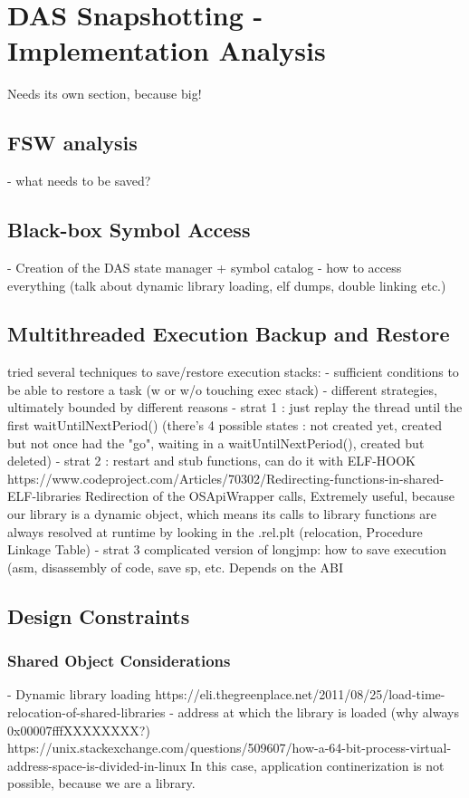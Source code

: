 {
\setlength{\parindent}{2em}
\chapter{DAS Snapshotting - Implementation Analysis}\label{cha:das-impl}
Needs its own section, because big!
\section{FSW analysis}
- what needs to be saved?
\section{Black-box Symbol Access}
- Creation of the DAS state manager + symbol catalog
- how to access everything (talk about dynamic library loading, elf dumps, double linking etc.)
\section{Multithreaded Execution Backup and Restore}
tried several techniques to save/restore execution stacks:
- sufficient conditions to be able to restore a task (w or w/o touching exec stack)
- different strategies, ultimately bounded by different reasons 
- strat 1 : just replay the thread until the first waitUntilNextPeriod() (there's 4 possible states : not created yet, created but not once had the "go", waiting in a waitUntilNextPeriod(), created but deleted)
- strat 2 : restart and stub functions, can do it with ELF-HOOK https://www.codeproject.com/Articles/70302/Redirecting-functions-in-shared-ELF-libraries
	Redirection of the OSApiWrapper calls, Extremely useful, because our library is a dynamic object, which means its calls to library functions are always resolved at runtime by looking in the .rel.plt (relocation, Procedure Linkage Table)
- strat 3 complicated version of longjmp: how to save execution (asm, disassembly of code, save sp, etc.%
Depends on the ABI
\section{Design Constraints}
\subsection*{Shared Object Considerations}\label{sec:dynlib-considerations}
- Dynamic library loading  https://eli.thegreenplace.net/2011/08/25/load-time-relocation-of-shared-libraries
- address at which the library is loaded (why always 0x00007fffXXXXXXXX?) https://unix.stackexchange.com/questions/509607/how-a-64-bit-process-virtual-address-space-is-divided-in-linux
In this case, application continerization is not possible, because we are a library.

}
